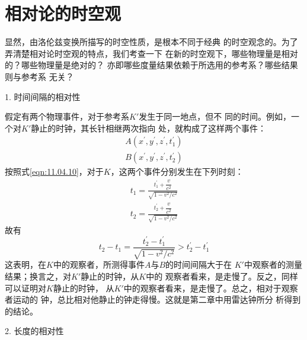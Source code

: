 \documentclass[../outline-of-mechanics.tex]{subfiles}
\begin{document}
\section{相对论的时空观}\label{sec:11.05}

显然，由洛伦兹变换所描写的时空性质，是根本不同于经典
的时空观念的。为了弄清楚相对论时空观的特点，我们考查一下
在新的时空观下，哪些物理量是相对的？哪些物理量是绝对的？
亦即哪些度量结果依赖于所选用的参考系？哪些结果则与参考系
无关？

\textsf{1. 时间间隔的相对性}

假定有两个物理事件，对于参考系$ K' $发生于同一地点，但不
同的时间。例如，一个对$ K' $静止的时钟，其长针相继两次指向
处，就构成了这样两个事件：
\begin{align*}
  A \left( x ^ { \prime } , y ^ { \prime } , z ^ { \prime } , t _ { 1 } ^ { \prime } \right) \\
  B \left( x ^ { \prime } , y ^ { \prime } , z ^ { \prime } , t _ { 2 } ^ { \prime } \right)
\end{align*}
按照式\eqref{eqn:11.04.10}，对于$ K $，这两个事件分别发生在下列时刻：
\begin{align*}
  t _ { 1 } = \frac { t _ { 1 } ^ { \prime } + \dfrac { v } { c ^ { 2 } } } { \sqrt { 1 - v ^ { 2 } / c ^ { 2 } } } \\
  t _ { 2 } = \frac { t _ { 2 } ^ { \prime } + \dfrac { v } { c ^ { 2 } } } { \sqrt { 1 - v ^ { 2 } / c ^ { 2 } } }
\end{align*}
故有
\begin{equation}\label{eqn:11.05.01}
  t _ { 2 } - t _ { 1 } = \frac { t _ { 2 } ^ { \prime } - t _ { 1 } ^ { \prime } } { \sqrt{ 1 - v ^ { 2 } / c ^ { 2 } } } > t _ 2 ^ { \prime } - t _ 1 ^ { \prime }
\end{equation}
这表明，在$ K $中的观察者，所测得事件$ A $与$ B $的时间间隔大于在
$ K ' $中观察者的测量结果；换言之，对$ K ' $静止的时钟，从$ K $中的
观察者看来，是走慢了。反之，同样可以证明对$ K $静止的时钟，
从$ K ' $中的观察者看来，是走慢了。总之，相对于观察者运动的
\clearpage\noindent
钟，总比相对他静止的钟走得慢。这就是第二章中用雷达钟所分
析得到的结论。

\textsf{2. 长度的相对性}
\end{document}

